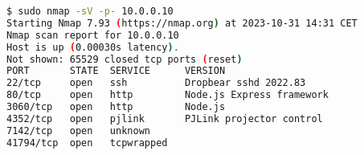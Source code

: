 
\begin{lstlisting}[style=nmap, language=bash, caption={Zeigt die Ausgabe des Portscans des Geräts mit nmap. Die hier verwendeten Flags \texttt{-sV -p-}
                            bezwecken die Ausgabe der Version der Services aller Ports.},label={lst:nmap-scan}]
$ sudo nmap -sV -p- 10.0.0.10
Starting Nmap 7.93 (https://nmap.org) at 2023-10-31 14:31 CET
Nmap scan report for 10.0.0.10
Host is up (0.00030s latency).
Not shown: 65529 closed tcp ports (reset)
PORT       STATE  SERVICE      VERSION
22/tcp     open   ssh          Dropbear sshd 2022.83
80/tcp     open   http         Node.js Express framework
3060/tcp   open   http         Node.js
4352/tcp   open   pjlink       PJLink projector control
7142/tcp   open   unknown
41794/tcp  open   tcpwrapped
\end{lstlisting}